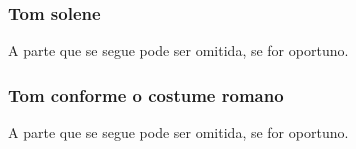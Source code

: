 \subsubsection{Tom solene}
\begin{rubrica}
  A parte que se segue pode ser omitida, se for oportuno.
\end{rubrica}


\subsubsection{Tom conforme o costume romano}
\begin{rubrica}
  A parte que se segue pode ser omitida, se for oportuno.
\end{rubrica}

